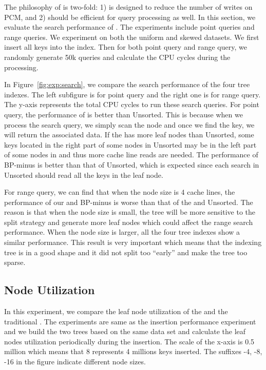 The philosophy of \bptree is two-fold: 1) \bptree is designed to
reduce the number of writes on PCM, and 2) \bptree should be
efficient for query processing as well. In this section, we
evaluate the search performance of \bptree. The experiments
include point queries and range queries. We experiment on both the
uniform and skewed datasets. We first insert all  keys into the
index. Then for both point query and range query, we randomly
generate 50k queries and  calculate the CPU cycles during the
processing.


In Figure~\ref{fig:exp:search}, we compare the search performance
of the four tree indexes. The left subfigure is for point query
and the right one is for range query. The y-axis represents the total
CPU cycles to run these search queries. For point query, the
performance of \bptree is better than Unsorted. This is because
when we process the search query, we simply scan the node and once
we find the key, we will return the associated data.
If the \bptree has more leaf nodes than Unsorted, some keys
located in the right part of some nodes in Unsorted may be in the
left part of some nodes in \bptree and thus more cache line reads
are needed.
The performance of BP-minus is better than that of Unsorted, which
is expected since each search in Unsorted should read all the keys
in the leaf node.



For range query, we can find that when the node size is 4 cache
lines, the performance of our \bptree and BP-minus is worse than
that of the \bplustree and Unsorted. The reason is that when the
node size is small, the tree will be more sensitive to the split
strategy and generate more leaf nodes which could affect the range
search performance. When the node size is larger, all the four
tree indexes show a similar performance. This result is very important
which means that the indexing tree is in a good shape and it did not
split too ``early'' and make the tree too sparse. 



\subsection{Node Utilization}

In this experiment, we compare the leaf node utilization of the
\bptree and the traditional \bplustree. The experiments are same
as the insertion performance experiment and we build the two trees
based on the same data set and calculate the leaf nodes
utilization periodically during the insertion. The scale of the x-axis is 
0.5 million which means that 8 represents 4 millions keys inserted. The suffixes -4,
-8, -16  in the figure indicate different node sizes. 

